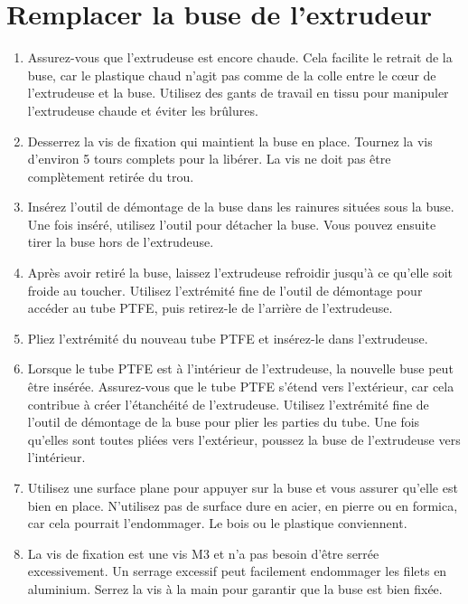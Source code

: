 \documentclass{Thesis}
\begin{document}
\section{Remplacer la buse de l'extrudeur}
\begin{enumerate}
    \item Assurez-vous que l'extrudeuse est encore chaude. Cela facilite le retrait de la buse, car le plastique chaud n'agit pas comme de la colle entre le cœur de l'extrudeuse et la buse. Utilisez des gants de travail en tissu pour manipuler l'extrudeuse chaude et éviter les brûlures.
    \item Desserrez la vis de fixation qui maintient la buse en place. Tournez la vis d'environ 5 tours complets pour la libérer. La vis ne doit pas être complètement retirée du trou.
    \item Insérez l'outil de démontage de la buse dans les rainures situées sous la buse. Une fois inséré, utilisez l'outil pour détacher la buse. Vous pouvez ensuite tirer la buse hors de l'extrudeuse.
    \item Après avoir retiré la buse, laissez l'extrudeuse refroidir jusqu'à ce qu'elle soit froide au toucher. Utilisez l'extrémité fine de l'outil de démontage pour accéder au tube PTFE, puis retirez-le de l'arrière de l'extrudeuse.
    \item Pliez l'extrémité du nouveau tube PTFE et insérez-le dans l'extrudeuse.
    \item Lorsque le tube PTFE est à l'intérieur de l'extrudeuse, la nouvelle buse peut être insérée. Assurez-vous que le tube PTFE s'étend vers l'extérieur, car cela contribue à créer l'étanchéité de l'extrudeuse. Utilisez l'extrémité fine de l'outil de démontage de la buse pour plier les parties du tube. Une fois qu'elles sont toutes pliées vers l'extérieur, poussez la buse de l'extrudeuse vers l'intérieur.
    \item Utilisez une surface plane pour appuyer sur la buse et vous assurer qu'elle est bien en place. N'utilisez pas de surface dure en acier, en pierre ou en formica, car cela pourrait l'endommager. Le bois ou le plastique conviennent.
    \item La vis de fixation est une vis M3 et n'a pas besoin d'être serrée excessivement. Un serrage excessif peut facilement endommager les filets en aluminium. Serrez la vis à la main pour garantir que la buse est bien fixée.
\end{enumerate}

\newpage
\appendix
\end{document}
